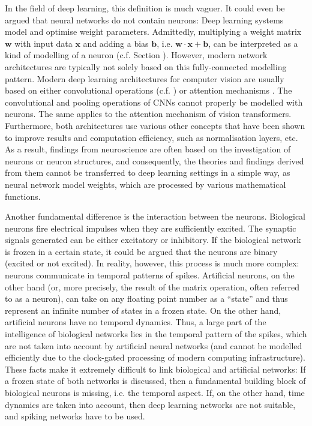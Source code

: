 In the field of deep learning, this definition is much vaguer. It could even be argued that neural networks do not contain neurons: Deep learning systems model and optimise weight parameters. Admittedly, multiplying a weight matrix $\boldsymbol{w}$ with input data $\boldsymbol{x}$ and adding a bias $\boldsymbol{b}$, i.e. $\boldsymbol{w} \cdot \boldsymbol{x} + \boldsymbol{b}$, can be interpreted as a kind of modelling of a neuron (c.f. Section ). 
However, modern network architectures are typically not solely based on this fully-connected modelling pattern.
Modern deep learning architectures for computer vision are usually based on either convolutional operations (c.f. ) or attention mechanisms . The convolutional and pooling operations of CNNs cannot properly be modelled with neurons. The same applies to the attention mechanism of vision transformers. Furthermore, both architectures use various other concepts that have been shown to improve results and computation efficiency, such as normalisation layers, etc.
As a result, findings from neuroscience are often based on the investigation of neurons or neuron structures, and consequently, the theories and findings derived from them cannot be transferred to deep learning settings in a simple way, as neural network model weights, which are processed by various mathematical functions.

Another fundamental difference is the interaction between the neurons. Biological neurons fire electrical impulses when they are sufficiently excited. The synaptic signals generated can be either excitatory or inhibitory. If the biological network is frozen in a certain state, it could be argued that the neurons are binary (excited or not excited). In reality, however, this process is much more complex: neurons communicate in temporal patterns of spikes.
Artificial neurons, on the other hand (or, more precisely, the result of the matrix operation, often referred to as a neuron), can take on any floating point number as a ``state'' and thus represent an infinite number of states in a frozen state. On the other hand, artificial neurons have no temporal dynamics. Thus, a large part of the intelligence of biological networks lies in the temporal pattern of the spikes, which are not taken into account by artificial neural networks (and cannot be modelled efficiently due to the clock-gated processing of modern computing infrastructure). These facts make it extremely difficult to link biological and artificial networks: If a frozen state of both networks is discussed, then a fundamental building block of biological neurons is missing, i.e. the temporal aspect. If, on the other hand, time dynamics are taken into account, then deep learning networks are not suitable, and spiking networks have to be used.

